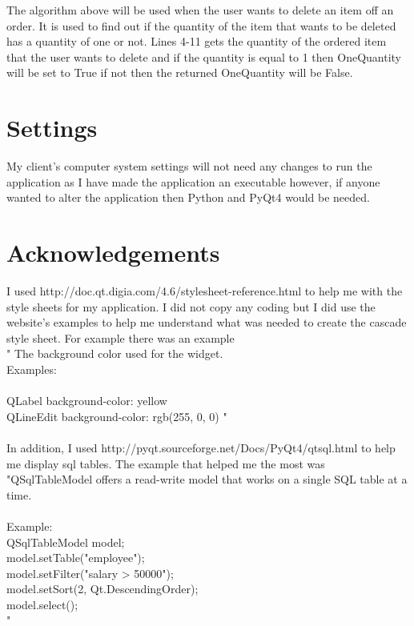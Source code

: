 {
The algorithm above will be used when the user wants to delete an item off an order. It is used to find out if the quantity of the item that wants to be deleted has a quantity of one or not. Lines 4-11 gets the quantity of the ordered item that the user wants to delete and if the quantity is equal to 1 then OneQuantity will be set to True if not then the returned OneQuantity will be False. 
\section{Settings}

My client's computer system settings will not need any changes to run the application as I have made the application an executable however, if anyone wanted to alter the application then Python and PyQt4 would be needed.

\section{Acknowledgements}

I used http://doc.qt.digia.com/4.6/stylesheet-reference.html to help me with the style sheets for my application. I did not copy any coding but I did use the website's examples to help me understand what was needed to create the cascade style sheet. For example there was an example \\
" The background color used for the widget. \\
Examples: \\ \\
 QLabel { background-color: yellow } \\
 QLineEdit { background-color: rgb(255, 0, 0) }"
\\ \\
In addition, I used http://pyqt.sourceforge.net/Docs/PyQt4/qtsql.html to help me display sql tables. The example that helped me the most was \\
"QSqlTableModel offers a read-write model that works on a single SQL table at a time. \\
\\
Example:
\\
        QSqlTableModel model; \\
        model.setTable("employee"); \\
        model.setFilter("salary > 50000"); \\
        model.setSort(2, Qt.DescendingOrder); \\
        model.select(); \\
"

}
